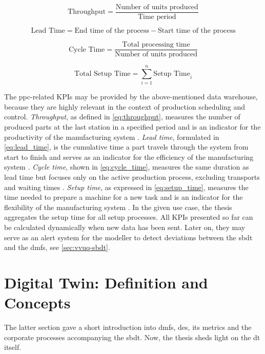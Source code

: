 \begin{equation}
  \text{Throughput} = \frac{\text{Number of units produced}}{\text{Time period}}
  \label{eq:throughput}
\end{equation}

\begin{equation}
  \text{Lead Time} = \text{End time of the process} - \text{Start time of the process}
  \label{eq:lead_time}
\end{equation}

\begin{equation}
  \text{Cycle Time} = \frac{\text{Total processing time}}{\text{Number of units produced}}
  \label{eq:cycle_time}
\end{equation}

\begin{equation}
  \text{Total Setup Time} = \sum_{i=1}^{n} \text{Setup Time}_i
  \label{eq:setup_time}
\end{equation}

The \gls{ppc}-related KPIs may be provided by the above-mentioned data warehouse, because they are highly relevant in the context of production scheduling and control. \textit{Throughput}, as defined in \autoref{eq:throughput}, measures the number of produced parts at the last station in a specified period and is an indicator for the productivity of the manufacturing system \autocite{hopp2011factory, imseitif2019throughput}. \textit{Lead time}, formulated in \autoref{eq:lead_time}, is the cumulative time a part travels through the system from start to finish and serves as an indicator for the efficiency of the manufacturing system \autocite{slack2010operations, pfeiffer2016manufacturing}. \textit{Cycle time}, shown in \autoref{eq:cycle_time}, measures the same duration as lead time but focuses only on the active production process, excluding transports and waiting times \autocite{goldratt2004goal, griffin1993metrics}. \textit{Setup time}, as expressed in \autoref{eq:setup_time}, measures the time needed to prepare a machine for a new task and is an indicator for the flexibility of the manufacturing system \autocite{allahverdi1999review, allahverdi2008significance}. In the given use case, the thesis aggregates the setup time for all setup processes. All KPIs presented so far can be calculated dynamically when new data has been sent. Later on, they may serve as an alert system for the modeller to detect deviations between the \gls{sbdt} and the \gls{dmfs}, see \autoref{sec:vvuq-sbdt}.

\section{Digital Twin: Definition and Concepts}
\label{sec:digital-twin}
The latter section gave a short introduction into \gls{dmfs}, \gls{des}, its metrics and the corporate processes accompanying the \gls{sbdt}. Now, the thesis sheds light on the \gls{dt} itself.

